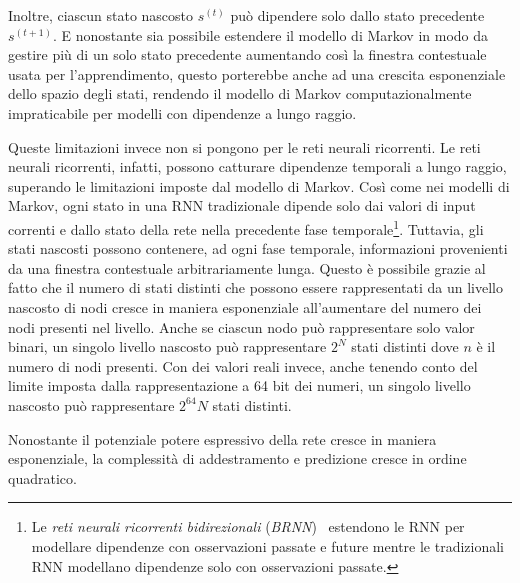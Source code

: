 Inoltre, ciascun stato nascosto $s^{(t)}$ pu\`o dipendere solo dallo stato
precedente $s^{(t+1)}$. E nonostante sia possibile estendere il modello di Markov
in modo da gestire pi\`u di un solo stato precedente aumentando cos\`i la finestra
contestuale usata per l'apprendimento, questo porterebbe anche ad una crescita
esponenziale dello spazio degli stati, rendendo il modello di Markov computazionalmente
impraticabile per modelli con dipendenze a lungo raggio.

Queste limitazioni invece non si pongono per le reti neurali ricorrenti. Le reti
neurali ricorrenti, infatti, possono catturare dipendenze temporali a lungo raggio,
superando le limitazioni imposte dal modello di Markov. Cos\`i come nei modelli
di Markov, ogni stato in una RNN tradizionale dipende solo dai valori di input
correnti e dallo stato della rete nella precedente fase temporale\footnote{Le
\emph{reti neurali ricorrenti bidirezionali} (\emph{BRNN})~\cite{Schuster:1997}
estendono le RNN per modellare dipendenze con osservazioni passate e future mentre
le tradizionali RNN modellano dipendenze solo con osservazioni passate.}. Tuttavia,
gli stati nascosti possono contenere, ad ogni fase temporale, informazioni
provenienti da una finestra contestuale arbitrariamente lunga. Questo \`e possibile
grazie al fatto che il numero di stati distinti che possono essere rappresentati
da un livello nascosto di nodi cresce in maniera esponenziale all'aumentare del
numero dei nodi presenti nel livello. Anche se ciascun nodo pu\`o rappresentare
solo valor binari, un singolo livello nascosto pu\`o rappresentare $2^N$ stati
distinti dove $n$ \`e il numero di nodi presenti. Con dei valori reali invece,
anche tenendo conto del limite imposta dalla rappresentazione a 64 bit dei numeri,
un singolo livello nascosto pu\`o rappresentare $2^64N$ stati distinti.

Nonostante il potenziale potere espressivo della rete cresce in maniera esponenziale,
la complessit\`a di addestramento e predizione cresce in ordine quadratico.

